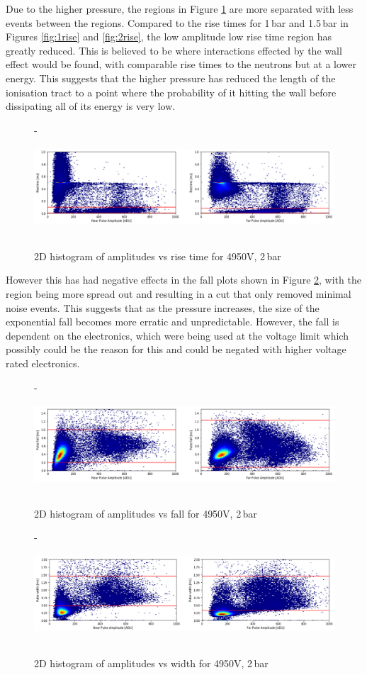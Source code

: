 \documentclass[a4paper]{article}
\begin{document}
\noindent Due to the higher pressure, the regions in Figure \ref{fig:3rise} are more separated with less events between the regions. Compared to the rise times for 1\,bar and 1.5\,bar in Figures \ref{fig:1rise} and \ref{fig:2rise}, the low amplitude low rise time region has greatly reduced. This is believed to be where interactions effected by the wall effect would be found, with comparable rise times to the neutrons but at a lower energy. This suggests that the higher pressure has reduced the length of the ionisation tract to a point where the probability of it hitting the wall before dissipating all of its energy is very low.
\begin{figure}[H]-
    \centering
    \includegraphics[height=3.7cm]{uk26n000_rise.png}
    \caption{2D histogram of amplitudes vs rise time for 4950V, 2\,bar}   
    \label{fig:3rise}
\end{figure}
\noindent However this has had negative effects in the fall plots shown in Figure \ref{fig:3fall}, with the region being more spread out and resulting in a cut that only removed minimal noise events. This suggests that as the pressure increases, the size of the exponential fall becomes more erratic and unpredictable. However, the fall is dependent on the electronics, which were being used at the voltage limit which possibly could be the reason for this and could be negated with higher voltage rated electronics.
\begin{figure}[H]-
    \centering
    \includegraphics[height=3.7cm]{uk26n000_fall.png}
    \caption{2D histogram of amplitudes vs fall for 4950V, 2\,bar}
    \label{fig:3fall}
\end{figure}
\begin{figure}[H]-
    \centering
    \includegraphics[height=3.7cm]{uk26n000_dur.png}
    \caption{2D histogram of amplitudes vs width  for 4950V, 2\,bar}
    \label{fig:3dur}
\end{figure}
\end{document}
